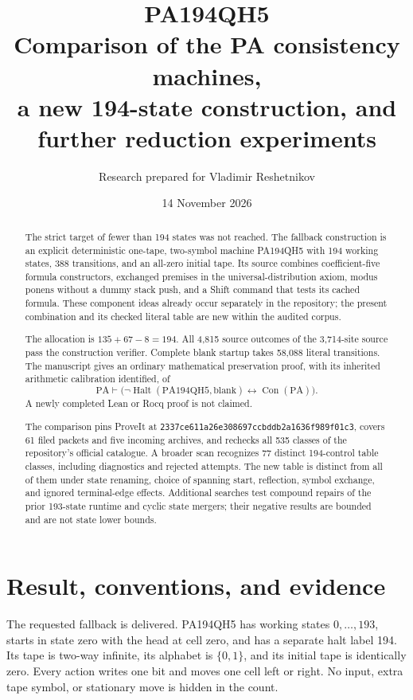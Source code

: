 \documentclass[11pt,letterpaper]{article}
\title{\color{inkblue}PA194QH5\\[5pt]
\large Comparison of the PA consistency machines,\\a new 194-state construction, and further reduction experiments}
\author{Research prepared for Vladimir Reshetnikov}
\date{14 November 2026}
\newcommand{\PA}{\mathrm{PA}}
\newcommand{\Con}{\operatorname{Con}}
\newcommand{\Halt}{\operatorname{Halt}}
\newcommand{\snapshot}{\texttt{2337ce611a26e308697ccbddb2a1636f989f01c3}}
\begin{document}
\maketitle
\begin{abstract}
The strict target of fewer than 194 states was not reached. The fallback
construction is an explicit deterministic one-tape, two-symbol machine
PA194QH5 with 194 working states, 388 transitions, and an all-zero initial
tape. Its source combines coefficient-five formula constructors, exchanged
premises in the universal-distribution axiom, modus ponens without a dummy
stack push, and a Shift command that tests its cached formula. These component
ideas already occur separately in the repository; the present combination
and its checked literal table are new within the audited corpus.

The allocation is $135+67-8=194$. All 4,815 source outcomes of the
3,714-site source pass the construction verifier. Complete blank startup
takes 58,088 literal transitions. The manuscript gives an ordinary
mathematical preservation proof, with its inherited arithmetic calibration
identified, of
\[
 \PA\vdash\bigl(\neg\Halt(\mathrm{PA194QH5},\mathrm{blank})
                     \leftrightarrow\Con(\PA)\bigr).
\]
A newly completed Lean or Rocq proof is not claimed.

The comparison pins ProveIt at \snapshot, covers 61 filed packets and five
incoming archives, and rechecks all 535 classes of the repository's official
catalogue. A broader scan recognizes 77 distinct 194-control table classes,
including diagnostics and rejected attempts. The new table is distinct from
all of them under state renaming, choice of spanning start, reflection,
symbol exchange, and ignored terminal-edge effects. Additional searches
test compound repairs of the prior 193-state runtime and cyclic state
mergers; their negative results are bounded and are not state lower bounds.
\end{abstract}
\clearpage\tableofcontents\clearpage

\section{Result, conventions, and evidence}

The requested fallback is delivered. PA194QH5 has working states
$0,\ldots,193$, starts in state zero with the head at cell zero, and has a
separate halt label 194. Its tape is two-way infinite, its alphabet is
$\{0,1\}$, and its initial tape is identically zero. Every action writes
one bit and moves one cell left or right. No input, extra tape symbol, or
stationary move is hidden in the count.
\end{document}
